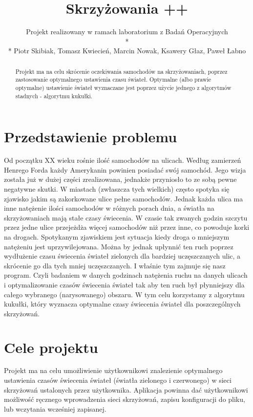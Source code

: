 \documentclass{article}
\title {Skrzyżowania ++}
\author{Projekt realizowany w ramach laboratorium z Badań Operacyjnych \\* \\* Piotr Skibiak, Tomasz Kwiecień, Marcin Nowak, Ksawery Głaz, Paweł Łabno}
\institute{AGH, Wydział IEiT, Informatyka, rok 2014}
\begin{document}
\maketitle

\begin{abstract}
Projekt ma na celu skrócenie oczekiwania samochodów na skrzyżowaniach, poprzez zastosowanie optymalnego ustawienia czasu świateł. Optymalne (albo prawie optymalne) ustawienie świateł wyznaczane jest poprzez użycie jednego z algorytmów stadnych - algorytmu kukułki.   
\end{abstract}

\newpage
\renewcommand*\contentsname{Spis Treści}
\tableofcontents
\setcounter{tocdepth}{3}

\newpage

\section{Przedstawienie problemu}
    Od początku XX wieku rośnie ilość samochodów na ulicach. Według zamierzeń Henrego Forda każdy Amerykanin powinien posiadać swój samochód. Jego wizja została już w dużej części zrealizowana, jednakże przyniosło to ze sobą pewne negatywne skutki. W miastach (zwłaszcza tych wielkich) często spotyka się zjawisko jakim są zakorkowane ulice pełne samochodów. Jednak każda ulica ma inne natężenie ilości samochodów w różnych porach dnia, a światła na skrzyżowaniach mają stałe czasy świecenia. W czasie tak zwanych godzin szczytu przez jedne ulice przejeżdża więcej samochodów niż przez inne, co powoduje korki na drogach. Spotykanym zjawiskiem jest sytuacja kiedy droga o mniejszym natężeniu jest uprzywilejowana. Można by jednak upłynnić ten ruch poprzez wydłużenie czasu świecenia świateł zielonych dla bardziej uczęszczanych ulic, a skrócenie go dla tych mniej uczęszczanych. I właśnie tym zajmuje się nasz program. Czyli badaniem w danych godzinach natężenia ruchu na danych ulicach i optymalizowanie czasów świecenia świateł tak aby ten ruch był płynniejszy dla całego wybranego (narysowanego) obszaru. W tym celu korzystamy z algorytmu kukułki, który wyznacza optymalne czasy świecenia świateł dla poszczególnych skrzyżowań.

\section{Cele projektu}
    Projekt ma na celu umożliwienie użytkownikowi znalezienie optymalnego ustawienia czasów świecenia świateł (światła zielonego i czerwonego) w sieci skrzyżowań ustalonych przez użytkownika. Aplikacja powinna dać użytkownikowi możliwość ręcznego wprowadzenia sieci skrzyżowań, zapisu konfiguracji do pliku, lub wczytania wcześniej zapisanej. 
\end{document}
